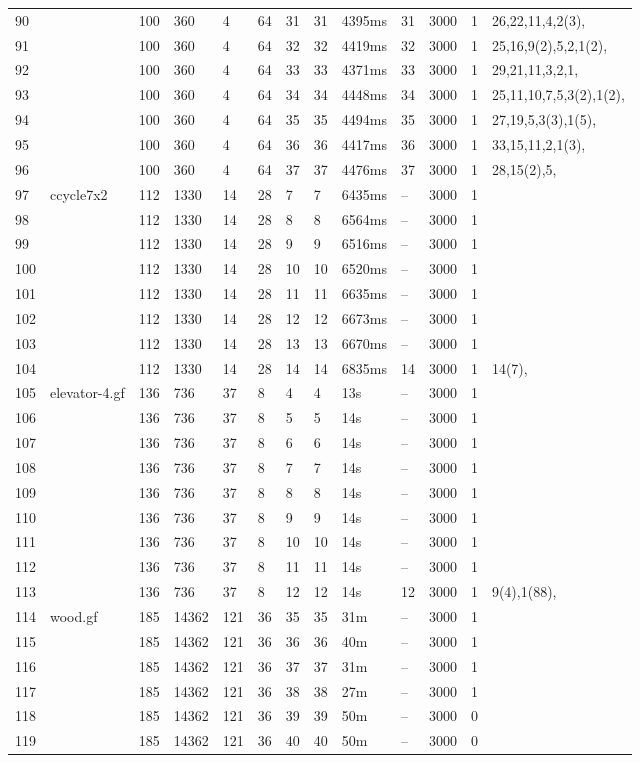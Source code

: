 \documentclass{article}
\begin{document}
\begin{longtable}{|l |l |l |l |l |l |l |l |l |l |l |l |l |}
90&&100&360&4&64&31&31&4395ms&31&3000&1&26,22,11,4,2(3),\\
91&&100&360&4&64&32&32&4419ms&32&3000&1&25,16,9(2),5,2,1(2),\\
92&&100&360&4&64&33&33&4371ms&33&3000&1&29,21,11,3,2,1,\\
93&&100&360&4&64&34&34&4448ms&34&3000&1&25,11,10,7,5,3(2),1(2),\\
94&&100&360&4&64&35&35&4494ms&35&3000&1&27,19,5,3(3),1(5),\\
95&&100&360&4&64&36&36&4417ms&36&3000&1&33,15,11,2,1(3),\\
96&&100&360&4&64&37&37&4476ms&37&3000&1&28,15(2),5,\\
97&ccycle7x2&112&1330&14&28&7&7&6435ms&--&3000&1&\\
98&&112&1330&14&28&8&8&6564ms&--&3000&1&\\
99&&112&1330&14&28&9&9&6516ms&--&3000&1&\\
100&&112&1330&14&28&10&10&6520ms&--&3000&1&\\
101&&112&1330&14&28&11&11&6635ms&--&3000&1&\\
102&&112&1330&14&28&12&12&6673ms&--&3000&1&\\
103&&112&1330&14&28&13&13&6670ms&--&3000&1&\\
104&&112&1330&14&28&14&14&6835ms&14&3000&1&14(7),\\
105&elevator-4.gf&136&736&37&8&4&4&13s&--&3000&1&\\
106&&136&736&37&8&5&5&14s&--&3000&1&\\
107&&136&736&37&8&6&6&14s&--&3000&1&\\
108&&136&736&37&8&7&7&14s&--&3000&1&\\
109&&136&736&37&8&8&8&14s&--&3000&1&\\
110&&136&736&37&8&9&9&14s&--&3000&1&\\
111&&136&736&37&8&10&10&14s&--&3000&1&\\
112&&136&736&37&8&11&11&14s&--&3000&1&\\
113&&136&736&37&8&12&12&14s&12&3000&1&9(4),1(88),\\
114&wood.gf&185&14362&121&36&35&35&31m&--&3000&1&\\
115&&185&14362&121&36&36&36&40m&--&3000&1&\\
116&&185&14362&121&36&37&37&31m&--&3000&1&\\
117&&185&14362&121&36&38&38&27m&--&3000&1&\\
118&&185&14362&121&36&39&39&50m&--&3000&0&\\
119&&185&14362&121&36&40&40&50m&--&3000&0&\\

\end{longtable}
\end{document}
